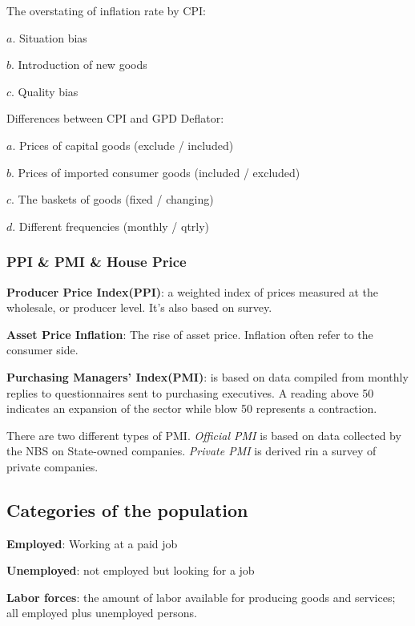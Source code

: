 \documentclass[10pt, a4paper]{article}
\begin{document}
            The overstating of inflation rate by CPI:

                $a$. Situation bias
            
                $b$. Introduction of new goods 
            
                $c$. Quality bias
            \newline 

            Differences between CPI and GPD Deflator:

            $a$. Prices of capital goods (exclude / included)
            
            $b$. Prices of imported consumer goods (included / excluded)

            $c$. The baskets of goods (fixed / changing)

            $d$. Different frequencies (monthly / qtrly)

            \subsubsection{PPI \& PMI \& House Price}
            
            \textbf{Producer Price Index(PPI)}: a weighted index of prices measured at the wholesale, or producer level. It's also based on survey. 

            \textbf{Asset Price Inflation}: The rise of asset price. Inflation often refer to the consumer side. 

            \textbf{Purchasing Managers' Index(PMI)}: is based on data compiled from monthly replies to questionnaires sent to purchasing executives. A reading above 50 indicates an expansion of the sector while blow 50 represents a contraction. 

            There are two different types of PMI. \emph{Official PMI} is based on data collected by the NBS on State-owned companies. \emph{Private PMI} is derived rin a survey of private companies. 
            
        \subsection{Categories of the population}  
            \textbf{Employed}: Working at a paid job 
            
            \textbf{Unemployed}: not employed but looking for a job 
            
            \textbf{Labor forces}: the amount of labor available for producing goods 
            and services; all employed plus unemployed persons. 
            
\end{document}
